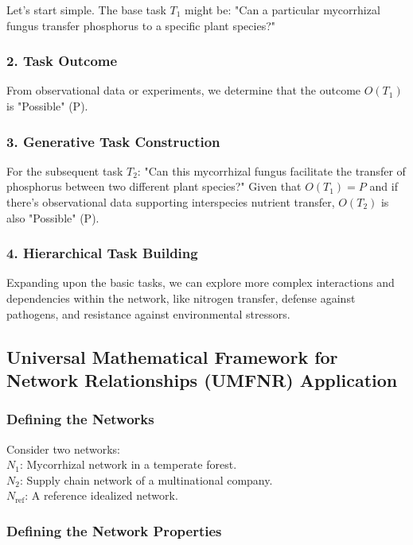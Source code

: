 \documentclass[sn-nature]{sn-jnl}%
\theoremstyle{thmstyleone}%
\theoremstyle{thmstyletwo}%
\theoremstyle{thmstylethree}%
\begin{document}
\begin{enumerate}
Let's start simple. The base task \( T_1 \) might be: "Can a particular mycorrhizal fungus transfer phosphorus to a specific plant species?"

\subsubsection*{2. Task Outcome}

From observational data or experiments, we determine that the outcome \( O(T_1) \) is "Possible" (P).

\subsubsection*{3. Generative Task Construction}

For the subsequent task \( T_2 \): "Can this mycorrhizal fungus facilitate the transfer of phosphorus between two different plant species?"
Given that \( O(T_1) = P \) and if there's observational data supporting interspecies nutrient transfer, \( O(T_2) \) is also "Possible" (P).

\subsubsection*{4. Hierarchical Task Building}

Expanding upon the basic tasks, we can explore more complex interactions and dependencies within the network, like nitrogen transfer, defense against pathogens, and resistance against environmental stressors.

\subsection*{Universal Mathematical Framework for Network Relationships (UMFNR) Application}

\subsubsection*{Defining the Networks}

Consider two networks: \\
\( N_1 \): Mycorrhizal network in a temperate forest. \\
\( N_2 \): Supply chain network of a multinational company. \\
\( N_{\text{ref}} \): A reference idealized network.


\subsubsection*{Defining the Network Properties}


\end{enumerate}
\end{document}
